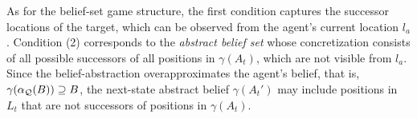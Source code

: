 \begin{itemize}
\begin{itemize}
\end{itemize}
As for the belief-set game structure, the first condition captures the successor locations of the target, which can be observed from the agent's current location $l_a$. Condition (2) corresponds to the \emph{abstract belief set} whose concretization  consists of all possible successors of all positions in $\gamma(A_t)$, which are  not visible from $l_a$. Since the belief-abstraction overapproximates the agent's belief, that is, $\gamma(\alpha_{\mathcal{Q}}(B)) \supseteq B$, the next-state abstract belief $\gamma(A_t')$ may include positions in $L_t$ that are not successors of positions in $\gamma(A_t)$.


\end{itemize}
